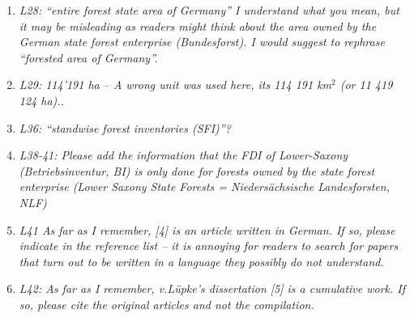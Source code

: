 \documentclass{article}
\begin{document}
\begin{enumerate}

  \item \textit{L28: “entire forest state area of Germany” I understand what you mean, but it may be misleading as readers might think about the area owned by the German state forest enterprise (Bundesforst). I would suggest to rephrase “forested area of Germany”.}
  
  
  
  \item \textit{L29: 114'191 ha – A wrong unit was used here, its 114 191 km$^2$ (or 11 419 124 ha)..}
  
  
  
  \item \textit{L36: “standwise forest inventories (SFI)”?}
  
  
  
  \item \textit{L38-41: Please add the information that the FDI of Lower-Saxony (Betriebsinventur, BI) is only done for forests owned by the state forest enterprise (Lower Saxony State Forests = Niedersächsische Landesforsten, NLF)}
  
  
  
  \item \textit{L41 As far as I remember, [4] is an article written in German. If so, please indicate in the reference list – it is annoying for readers to search for papers that turn out to be written in a language they possibly do not understand.}
  
  
  \item \textit{L42: As far as I remember, v.Lüpke’s dissertation [5] is a cumulative work. If so, please cite the original articles and not the compilation.}
  
  

\end{enumerate}
\end{document}
